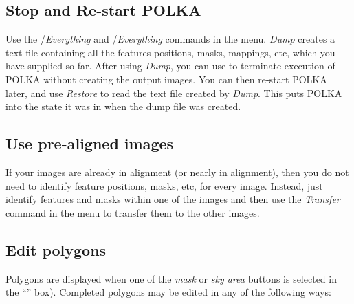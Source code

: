 \subsection {Stop and Re-start POLKA}
Use the /{\em Everything} and 
/{\em Everything} commands in the 
 menu. {\em Dump} creates a text file
containing all the features positions, masks, mappings, etc, which you
have supplied so far. After using {\em Dump}, you can use  to terminate execution of POLKA without creating the
output images. You can then re-start POLKA later, and use {\em Restore}
to read the text file created by {\em Dump}. This puts POLKA into the
state it was in when the dump file was created.

\subsection {Use pre-aligned images}
If your images are already in alignment (or nearly in alignment), then
you do not need to identify feature positions, masks, etc, for every image.
Instead, just identify features and masks within one of the images and then 
use the {\em Transfer} command in the 
menu to transfer them to the other images.

\subsection {Edit polygons}
Polygons are displayed when one of the {\em mask} or {\em sky
area} buttons is selected in the ``'' 
box). Completed polygons may be edited in any of the following ways:

